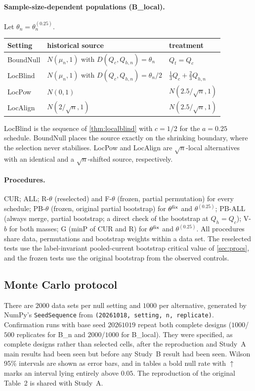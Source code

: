 \paragraph{Sample-size-dependent populations (B\_local).} Let $\theta_n=\theta_n^{(0.25)}$.
\begin{center}\small
\begin{tabular}{@{}lll@{}}
\toprule
Setting & historical source & treatment\\
\midrule
BoundNull & $N(\mu_n,1)$ with $D(Q_c,Q_{h,n})=\theta_n$ & $Q_t=Q_c$\\
LocBlind & $N(\mu_n,1)$ with $D(Q_c,Q_{h,n})=\theta_n/2$ & $\tfrac13Q_c+\tfrac23Q_{h,n}$\\
LocPow & $N(0,1)$ & $N(2.5/\sqrt n,1)$\\
LocAlign & $N(2/\sqrt n,1)$ & $N(2.5/\sqrt n,1)$\\
\bottomrule
\end{tabular}
\end{center}
LocBlind is the sequence of \cref{thm:localblind} with $c=1/2$ for the $a=0.25$ schedule. BoundNull places the source exactly on the shrinking boundary, where the selection never stabilises. LocPow and LocAlign are $\sqrt n$-local alternatives with an identical and a $\sqrt n$-shifted source, respectively.

\paragraph{Procedures.} CUR; ALL; R-$\theta$ (reselected) and F-$\theta$ (frozen, partial permutation) for every schedule; PB-$\theta$ (frozen, original partial bootstrap) for $\theta^{\rm fix}$ and $\theta^{(0.25)}$; PB-ALL (always merge, partial bootstrap; a direct check of the bootstrap at $Q_h=Q_c$); V-$b$ for both masses; G (minP of CUR and R) for $\theta^{\rm fix}$ and $\theta^{(0.25)}$. All procedures share data, permutations and bootstrap weights within a data set. The reselected tests use the label-invariant pooled-current bootstrap critical value of \cref{sec:procs}, and the frozen tests use the original bootstrap from the observed controls.

\subsection{Monte Carlo protocol}\label{sec:protocol}

There are $2000$ data sets per null setting and $1000$ per alternative, generated by NumPy's \texttt{SeedSequence} from \texttt{(20261018, setting, n, replicate)}. Confirmation runs with base seed $20261019$ repeat both complete designs ($1000$/$500$ replicates for B\_n and $2000$/$1000$ for B\_local). They were specified, as complete designs rather than selected cells, after the reproduction and Study~A main results had been seen but before any Study~B result had been seen. Wilson 95\% intervals are shown as error bars, and in tables a bold null rate with $\uparrow$ marks an interval lying entirely above $0.05$. The reproduction of the original Table~2 is shared with Study~A.

